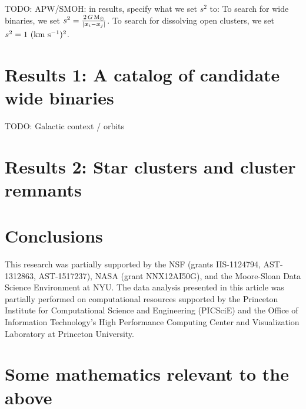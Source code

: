 \documentclass[manuscript, letterpaper]{aastex6}
\newcommand{\project}[1]{\textsl{#1}}
\newcommand{\acronym}[1]{{\small{#1}}}
\newcommand{\apogee}{\project{\acronym{APOGEE}}}
\newcommand{\bs}[1]{\boldsymbol{#1}}
\newcommand{\kms}{\rm km~s^{-1}}
\newcommand{\msun}{{\rm M}_\odot}
\newcommand{\todo}[1]{{\color{red}TODO: #1}}
\begin{document}
\todo{APW/SMOH: in results, specify what we set $s^2$ to:}
To search for wide binaries, we set $s^2 = \frac{2 \, G \, \msun}{|\bs{x}_i-\bs{x}_j|}$.
To search for dissolving open clusters, we set $s^2 = 1~(\kms)^2$.

\section{Results 1: A catalog of candidate wide binaries}

\todo{Galactic context / orbits}

\section{Results 2: Star clusters and cluster remnants}

\section{Conclusions}

\acknowledgements

This research was partially supported by the \acronym{NSF} (grants
  \acronym{IIS-1124794}, \acronym{AST-1312863}, \acronym{AST-1517237}),
  \acronym{NASA} (grant \acronym{NNX12AI50G}),
  and the Moore-Sloan Data Science Environment at \acronym{NYU}. The data
analysis presented in this article was partially performed on computational
resources supported by the Princeton Institute for Computational Science and
Engineering (PICSciE) and the Office of Information Technology's High
Performance Computing Center and Visualization Laboratory at Princeton
University.






\appendix

\section{Some mathematics relevant to the above} \label{sec:appendix}
\end{document}
